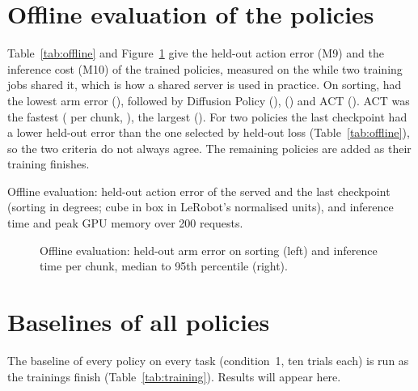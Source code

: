 \section{Offline evaluation of the policies}\label{sec:offline}

Table~\ref{tab:offline} and Figure~\ref{fig:offline} give the held-out action error (M9) and the inference cost (M10)
of the trained policies, measured on the  while two training jobs shared it, which is how a shared
server is used in practice. On sorting, \smolvla{} had the lowest arm error (\degree),
followed by Diffusion Policy (\degree), \groot{} (\degree)
and ACT (\degree). ACT was the fastest ( per chunk,
), \groot{} the largest (). For two policies the last
checkpoint had a lower held-out error than the one selected by held-out loss (Table~\ref{tab:offline}), so the two
criteria do not always agree. The remaining policies are added as their training finishes.

\begin{table}[htbp]
  \centering
  \caption{Offline evaluation: held-out action error of the served and the last checkpoint (sorting in degrees; cube in
           box in LeRobot's normalised units), and inference time and peak GPU memory over 200 requests.}
  \label{tab:offline}
  \small
  \begin{adjustbox}{max width=\textwidth}
  \end{adjustbox}
\end{table}

\begin{figure}[htbp]
  \centering
  \caption{Offline evaluation: held-out arm error on sorting (left) and inference time per chunk, median to 95th
           percentile (right).}
  \label{fig:offline}
\end{figure}

\section{Baselines of all policies}\label{sec:baselines}

The baseline of every policy on every task (condition~1, ten trials each) is run as the trainings finish
(Table~\ref{tab:training}). \pending{} Results will appear here.

